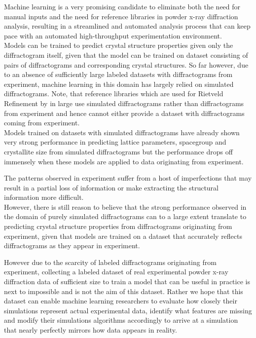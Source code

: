 Machine learning is a very promising candidate to eliminate both the need for manual inputs and the need for reference
libraries in powder x-ray diffraction analysis, resulting in a streamlined and automated analysis process that can
keep pace with an automated high-throughput experimentation environment. \\

Models can be trained to predict crystal structure properties given only the diffractogram itself, given that
the model can be trained on dataset consisting of pairs of diffractograms and corresponding crystal structures.
So far however, due to an absence of sufficiently large labeled datasets with diffractograms from experiment,
machine learning in this domain has largely relied on simulated diffractograms.
Note, that reference libraries which are used for Rietveld Refinement by in large use simulated diffractograms
rather than diffractograms from experiment and hence cannot either provide a dataset with diffractograms coming
from experiment. \\

Models trained on datasets with simulated diffractograms have already shown very strong performance in predicting
lattice parameters, spacegroup and crystallite size from simulated diffractograms but the performance drops off immensely when these models are applied to data originating from experiment.

The patterns observed in experiment suffer from a host of imperfections that may result in a partial loss of information or make extracting the structural information more difficult. \\
However, there is still reason to believe that the strong performance observed in the domain of purely simulated diffractograms can to a large extent translate to predicting crystal structure properties from diffractograms originating from experiment, given that models are trained on a dataset that accurately reflects diffractograms as they appear in experiment.

However due to the scarcity of labeled diffractograms originating from experiment, collecting a labeled dataset
of real experimental powder x-ray diffraction data of sufficient size to train a model
that can be useful in practice is next to impossible and is not the aim of this dataset.
Rather we hope that this dataset can enable machine learning researchers to evaluate how closely their simulations
represent actual experimental data, identify what features are missing and modify their simulations algorithms accordingly to arrive at a simulation that nearly perfectly mirrors how data appears in reality.\\

